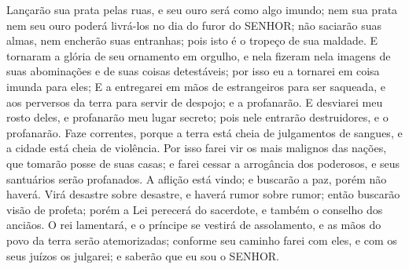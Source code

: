 {Lançarão sua prata pelas ruas, e seu ouro será como algo imundo; nem sua prata nem seu ouro poderá livrá-los no dia do furor do SENHOR; não saciarão suas almas, nem encherão suas entranhas; pois isto é o tropeço de sua maldade.
E tornaram a glória de seu ornamento em orgulho, e nela fizeram nela imagens de suas abominações e de suas coisas detestáveis; por isso eu a tornarei em coisa imunda para eles;
E a entregarei em mãos de estrangeiros para ser saqueada, e aos perversos da terra para servir de despojo; e a profanarão.
E desviarei meu rosto deles, e profanarão meu lugar secreto; pois nele entrarão destruidores, e o profanarão.
Faze correntes,
 porque a terra está cheia de julgamentos de sangues, e a cidade está cheia de violência.
Por isso farei vir os mais malignos das nações, que tomarão posse de suas casas; e farei cessar a arrogância dos poderosos,
 e seus santuários serão profanados.
A aflição
 está vindo; e buscarão a paz, porém não haverá.
Virá desastre sobre desastre, e haverá rumor sobre rumor; então buscarão visão de profeta; porém a Lei perecerá do sacerdote, e também o conselho dos anciãos.
O rei lamentará, e o príncipe se vestirá de assolamento, e as mãos do povo da terra serão atemorizadas; conforme seu caminho farei com eles, e com os seus juízos os julgarei; e saberão que eu sou o SENHOR.

}
